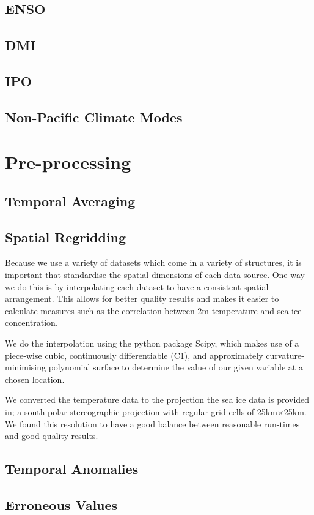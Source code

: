 \documentclass[../main.tex]{subfiles}
\begin{document}
\subsection*{ENSO}
\subsection*{DMI}
\subsection*{IPO}
\subsection*{Non-Pacific Climate Modes}


\section{Pre-processing}
\subsection*{Temporal Averaging}
\subsection*{Spatial Regridding}
Because we use a variety of datasets which come in a variety of structures, it is important that standardise the spatial dimensions of each data source. One way we do this is by interpolating each dataset to have a consistent spatial arrangement. This allows for better quality results and makes it easier to calculate measures such as the correlation between 2m temperature and sea ice concentration.

We do the interpolation using the python package Scipy, which makes use of a piece-wise cubic, continuously differentiable (C1), and approximately curvature-minimising polynomial surface to determine the value of our given variable at a chosen location. 

We converted the temperature data to the projection the sea ice data is provided in; a south polar stereographic projection with regular grid cells of 25km$\times$25km. We found this resolution to have a good balance between reasonable run-times and good quality results.

\subsection*{Temporal Anomalies}
\subsection*{Erroneous Values}
\end{document}
